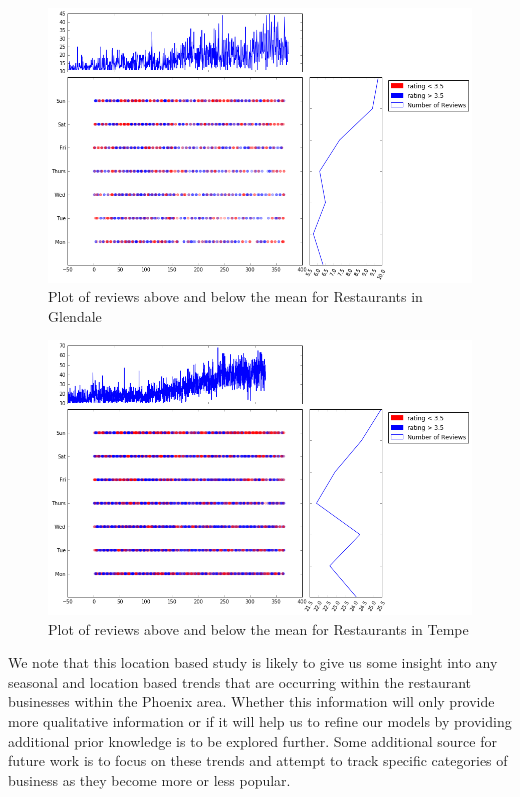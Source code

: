 \documentclass[11pt]{article}
\begin{document}
\begin{figure}[H]
\centering
\includegraphics[keepaspectratio=true,scale=0.4]{./images/glendale_restaurants}
\caption{Plot of reviews above and below the mean for Restaurants in Glendale}\label{fg:glendale}
\end{figure}

\begin{figure}[H]
\centering
\includegraphics[keepaspectratio=true,scale=0.4]{./images/tempe_restaurants}
\caption{Plot of reviews above and below the mean for Restaurants in Tempe}\label{fg:tempe}
\end{figure}

We note that this location based study is likely to give us some insight into any seasonal and location based trends that are occurring within the restaurant businesses within the Phoenix area. Whether this information will only provide more qualitative information or if it will help us to refine our models by providing additional prior knowledge is to be explored further. Some additional source for future work is to focus on these trends and attempt to track specific categories of business as they become more or less popular.
\end{document}
